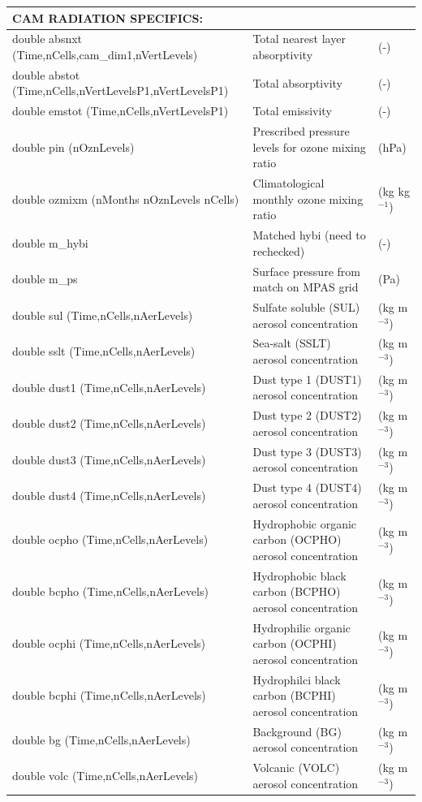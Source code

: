 \documentclass[11pt]{report}
\begin{document}
{\begin{longtable}{|p{2.0in} |p{3.0in} |p{1.0in} |}
\multicolumn{3}{|l|}{{\rule[-3mm]{0mm}{8mm}\bf CAM RADIATION SPECIFICS:} \hfill}\\ \hline
double absnxt \hfill\break(Time,nCells,cam\_dim1,nVertLevels)  & Total nearest layer absorptivity & (-) \\ \hline
double abstot  \hfill\break(Time,nCells,nVertLevelsP1,nVertLevelsP1) & Total absorptivity & (-) \\ \hline
double emstot  \hfil\break (Time,nCells,nVertLevelsP1) & Total emissivity & (-) \\ \hline
double pin (nOznLevels) & Prescribed pressure levels for ozone mixing ratio & (hPa) \\ \hline
double ozmixm \hfil\break (nMonths nOznLevels nCells) & Climatological monthly ozone mixing ratio & (kg kg$^{-1}$) \\ \hline
double m\_hybi & Matched hybi (need to rechecked) & (-) \\ \hline
double m\_ps  & Surface pressure from match on MPAS grid & (Pa) \\ \hline
double sul \hfill\break (Time,nCells,nAerLevels)  & Sulfate soluble (SUL) aerosol concentration & (kg m$^{-3}$) \\ \hline
double sslt \hfill\break (Time,nCells,nAerLevels)  & Sea-salt (SSLT) aerosol concentration & (kg m$^{-3}$) \\ \hline
double dust1 \hfil\break (Time,nCells,nAerLevels) & Dust type 1 (DUST1) aerosol concentration & (kg m$^{-3}$) \\ \hline
double dust2  \hfil\break (Time,nCells,nAerLevels) & Dust type 2 (DUST2) aerosol concentration & (kg m$^{-3}$) \\ \hline
double dust3 \hfil\break (Time,nCells,nAerLevels) & Dust type 3 (DUST3) aerosol concentration & (kg m$^{-3}$) \\ \hline
double dust4 \hfil\break (Time,nCells,nAerLevels) & Dust type 4 (DUST4) aerosol concentration & (kg m$^{-3}$) \\ \hline
double ocpho \hfil\break (Time,nCells,nAerLevels) & Hydrophobic organic carbon (OCPHO) aerosol concentration & (kg m$^{-3}$) \\ \hline
double bcpho \hfil\break (Time,nCells,nAerLevels) & Hydrophobic black carbon (BCPHO) aerosol concentration & (kg m$^{-3}$) \\ \hline
double ocphi \hfil\break (Time,nCells,nAerLevels) & Hydrophilic organic carbon (OCPHI) aerosol concentration & (kg m$^{-3}$) \\ \hline
double bcphi \hfil\break (Time,nCells,nAerLevels) & Hydrophilci black carbon (BCPHI) aerosol concentration & (kg m$^{-3}$) \\ \hline
double bg \hfill\break (Time,nCells,nAerLevels) & Background (BG) aerosol concentration & (kg m$^{-3}$) \\ \hline
double volc \hfill\break (Time,nCells,nAerLevels) & Volcanic (VOLC) aerosol concentration & (kg m$^{-3}$) \\ \hline
\end{longtable}
}
\end{document}

